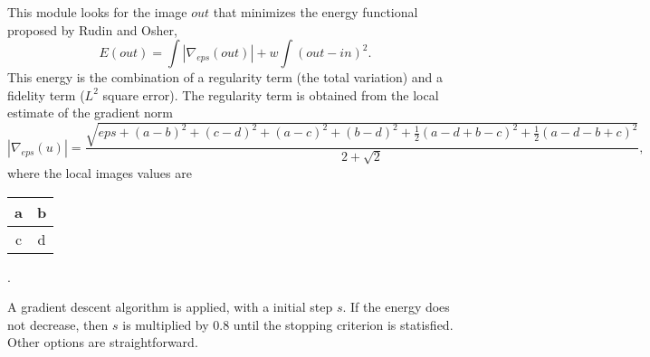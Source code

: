 This module looks for the image $out$ that minimizes the energy
functional proposed by Rudin and Osher,
$$E(out) = \int |\nabla_{eps}(out)| +  w \int (out -in)^2.$$
This energy is the combination of a regularity term (the total variation)
and a fidelity term ($L^2$ square error). The regularity term is 
obtained from the local estimate of the gradient norm
$$|\nabla_{eps}(u)| = \frac{\displaystyle
\sqrt{eps + (a-b)^2+(c-d)^2+(a-c)^2+(b-d)^2 
+ \frac 12 (a-d+b-c)^2 
+ \frac 12 (a-d-b+c)^2}}
{2+\sqrt{2}},$$
where the local images values are 
\begin{tabular}{|c|c|}
\hline
a & b \\
\hline
c & d \\
\hline
\end{tabular}.

A gradient descent algorithm is applied, with a initial step $s$.
If the energy does not decrease, then $s$ is multiplied by
$0.8$ until the stopping criterion is statisfied. 
Other options are straightforward.
